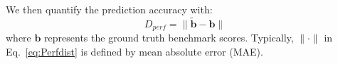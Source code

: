 We then quantify the prediction accuracy with:
\begin{equation}
D_{perf}=\|\tilde{\mathbf{b}}-\mathbf{b}\|
\label{eq:Perfdist}
\end{equation}
where $\mathbf{b}$ represents the ground truth benchmark scores. Typically, $\|\cdot\|$ in Eq.~\ref{eq:Perfdist} is defined by mean absolute error (MAE).







